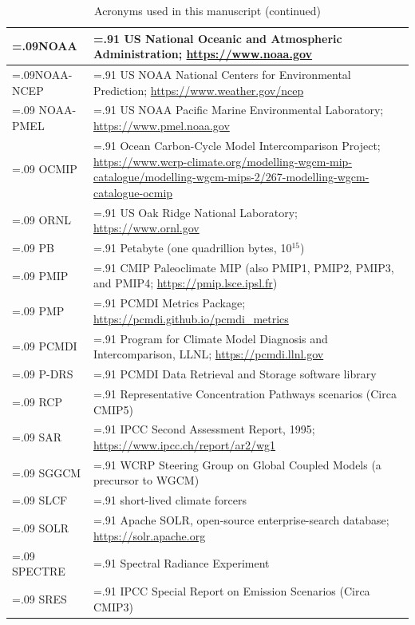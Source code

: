 \documentclass[manuscript]{copernicus}
\begin{document}
\addtocounter{table}{-1}
\begin{table}[htp]
\renewcommand{\arraystretch}{2}
\scriptsize
\centering
\caption{Acronyms used in this manuscript (continued)}
\resizebox{\textwidth}{!} {
	\begin{tabularx}{1\textwidth} { 
	  | >{\raggedright\arraybackslash\hsize=.09\hsize}X
	  | >{\centering\arraybackslash\hsize=.91\hsize}X | }
\hline
NOAA & US National Oceanic and Atmospheric Administration; \url{https://www.noaa.gov}\\ \hline
NOAA-NCEP & US NOAA National Centers for Environmental Prediction; \url{https://www.weather.gov/ncep}\\ \hline
NOAA-PMEL & US NOAA Pacific Marine Environmental Laboratory; \url{https://www.pmel.noaa.gov}\\ \hline
OCMIP & Ocean Carbon-Cycle Model Intercomparison Project; \url{https://www.wcrp-climate.org/modelling-wgcm-mip-catalogue/modelling-wgcm-mips-2/267-modelling-wgcm-catalogue-ocmip}\\ \hline
ORNL & US Oak Ridge National Laboratory; \url{https://www.ornl.gov}\\ \hline
PB & Petabyte (one quadrillion bytes, 10$^{15}$)\\ \hline
PMIP & CMIP Paleoclimate MIP (also PMIP1, PMIP2, PMIP3, and PMIP4; \url{https://pmip.lsce.ipsl.fr})\\ \hline
PMP & PCMDI Metrics Package; \url{https://pcmdi.github.io/pcmdi_metrics}\\ \hline
PCMDI & Program for Climate Model Diagnosis and Intercomparison, LLNL; \url{https://pcmdi.llnl.gov}\\ \hline
P-DRS & PCMDI Data Retrieval and Storage software library \citep[digital format;][]{drach_data_1995}\\ \hline
RCP & Representative Concentration Pathways scenarios (Circa CMIP5)\\ \hline
SAR & IPCC Second Assessment Report, 1995; \url{https://www.ipcc.ch/report/ar2/wg1}\\ \hline
SGGCM & WCRP Steering Group on Global Coupled Models (a precursor to WGCM)\\ \hline
SLCF & short-lived climate forcers\\ \hline
SOLR & Apache SOLR, open-source enterprise-search database; \url{https://solr.apache.org}\\ \hline
SPECTRE & Spectral Radiance Experiment\\ \hline
SRES & IPCC Special Report on Emission Scenarios (Circa CMIP3)\\ \hline

\end{tabularx}}
\end{table}
\end{document}
